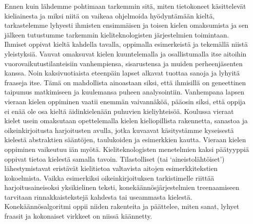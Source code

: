 \begin{multicols}{2}
Ennen kuin lähdemme pohtimaan tarkemmin sitä, miten tietokoneet käsittelevät
kieliainesta ja miksi niitä on vaikeaa ohjelmoida hyödyntämään kieltä,
tarkastelemme lyhyesti ihmisten ensimmäisen ja toisen kielen omaksumista ja sen
jälkeen tutustumme tarkemmin kieliteknologisten järjestelmien toimintaan.
Ihmiset oppivat kieltä kahdella tavalla, oppimalla esimerkeistä ja
tekemällä niistä yleistyksiä.  Vauvat omaksuvat kielen kuuntelemalla
ja osallistumalla itse aitoihin vuorovaikutustilanteisiin
vanhempiensa, sisarustensa ja muiden perheenjäsenten kanssa. Noin
kaksivuotiaista eteenpäin lapset alkavat tuottaa sanoja ja lyhyitä
fraaseja itse. Tämä on mahdollista ainoastaan siksi, että ihmisillä on
geneettinen taipumus matkimiseen ja kuulemansa puheen analysointiin.
Vanhempana lapsen vieraan kielen oppiminen vaatii enemmän vaivannäköä, pääosin
siksi, että oppija ei enää ole osa kieltä äidinkielenään puhuvien kieliyhteisöä.
Koulussa vieraat kielet usein omaksutaan opettelemalla kielen kieliopillista
rakennetta, sanastoa ja oikeinkirjoitusta harjoitusten avulla, jotka kuvaavat
käsitystämme kyseisestä kielestä abstraktien sääntöjen, taulukoiden ja
esimerkkien kautta. Vieraan kielen oppiminen vaikeutuu iän myötä.
Kieliteknologisten menetelmien kaksi päätyyppiä oppivat tietoa kielestä samalla
tavoin. Tilastolliset (tai ‘aineistolähtöiset’) lähestymistavat eristävät
kielitietoa valtavista aitojen esimerkkitekstien kokoelmista. Vaikka
esimerkiksi oikeinkirjoituksen tarkistimelle riittää harjoitusaineisoksi yksikielinen teksti, 
konekäännösjärjestelmien treenaamiseen tarvitaan
rinnakkaistekstejä kahdesta tai useammasta kielestä. Konekäännösalgoritmi oppii
niiden rakenteita ja päättelee, miten sanat, lyhyet fraasit ja kokonaiset virkkeet on
niissä käännetty.


\end{multicols}
